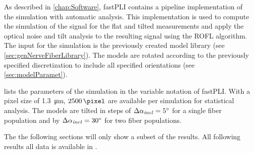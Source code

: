 %
As described in \cref{chap:Software}, \ac{fastPLI} contains a pipeline implementation of the simulation with automatic analysis.
This implementation is used to compute the simulation of the signal for the flat and tilted measurements and apply the optical noise and tilt analysis to the resulting signal using the \ac{ROFL} algorithm. 
The input for the simulation is the previously created model library (see \cref{sec:genNerveFiberLibrary}).
The models are rotated according to the previously specified discretization to include all specified orientations (see \cref{sec:modelParamet}).
\par
% 
 lists the parameters of the simulation in the variable notation of \ac{fastPLI}.
With a pixel size of \SI{1.3}{\micro\meter}, $\SI{2500}{\pixel}$ are available per simulation for statistical analysis.
The models are tilted in steps of $\Delta \textnormal{$\alpha_{\mathit{incl}}$} = \SI{5}{\degree}$ for a single fiber population and by $\Delta \textnormal{$\alpha_{\mathit{incl}}$} = \SI{30}{\degree}$ for two fiber populations.
\par
% 
The the following sections will only show a subset of the results. 
All following results all data is available in .
% 
% 
% 
